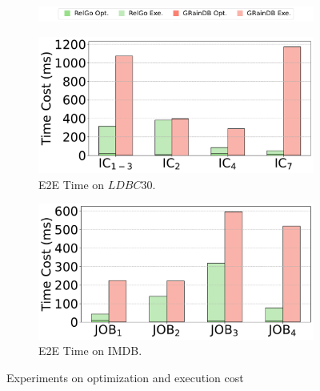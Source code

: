 \begin{figure}[t]
    \vspace{-0.5em}
    \centering
    \begin{subfigure}[b]{\linewidth}
        \centering
        \includegraphics[width=\linewidth]{./figures/exp/opt_exe_legends.pdf}
        \label{fig:exp-opt-legends}
        \vspace*{-3.5ex}
    \end{subfigure}
    \begin{subfigure}[b]{0.48\linewidth}
        \centering
        \includegraphics[width=\linewidth]{./figures/exp/opt_exe_ldbc.pdf}
        \vspace{-2em}
        \caption{E2E Time on $LDBC30$.}
        \label{fig:exp-opt-ldbc}
    \end{subfigure}
    \begin{subfigure}[b]{0.48\linewidth}
        \centering
        \includegraphics[width=\linewidth]{./figures/exp/opt_exe_job.pdf}
        \vspace{-2em}
        \caption{E2E Time on IMDB.}
        \label{fig:exp-opt-job}
    \end{subfigure}
    \caption{Experiments on optimization and execution cost}
    \vspace{-0.5em}
    \label{fig:exp-optimization}
\end{figure}


